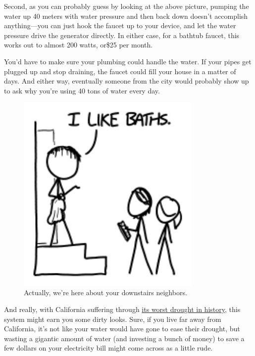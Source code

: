 {{Second, as you can probably guess by looking at the above picture, pumping the water up 40 meters with water pressure and then back down doesn't accomplish anything—you can just hook the faucet up to your device, and let the water pressure drive the generator directly. In either case, for a bathtub faucet, this works out to almost 200 watts, or\$25 per month.}

{You'd have to make sure your plumbing could handle the water. If your pipes get plugged up and stop draining, the faucet could fill your house in a matter of days. And either way, eventually someone from the city would probably show up to ask why you're using 40 tons of water every day.}

\begin{figure}[!htbp]
\centering
\includegraphics[scale=0.5, max width=0.8\textwidth]{imgs/a/91/faucet_baths.png}
\caption{Actually, we're here about your downstairs neighbors.}
\end{figure}

{And really, with California suffering through \href{http://www.wunderground.com/news/sierra-snowpack-after-photos-20140226}{its worst drought in history}, this system might earn you some dirty looks. Sure, if you live far away from California, it's not like your water would have gone to ease their drought, but wasting a gigantic amount of water (and investing a bunch of money) to save a few dollars on your electricity bill might come across as a little rude.}

}
